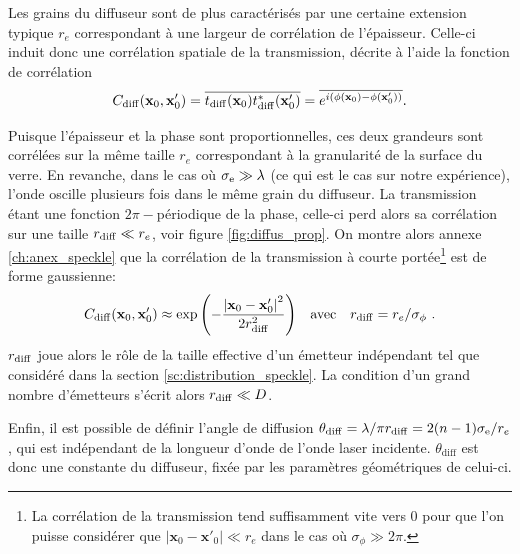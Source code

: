 Les grains du diffuseur sont de plus caractérisés par une certaine extension typique $r_e$ correspondant à une largeur de corrélation de l'épaisseur. Celle-ci induit donc une corrélation spatiale de la transmission, décrite à l'aide la fonction de corrélation
\begin{equation}
C_{\mathrm{diff}}(\mathbf{x}_0,\mathbf{x}'_0)=\overline{t_{\mathrm{diff}}(\mathbf{x}_0)t_{\mathrm{diff}}^*(\mathbf{x}'_0)}=\overline{e^{i(\phi(\mathbf{x}_0)-\phi(\mathbf{x}'_0))}} { .}
\end{equation}

Puisque l'épaisseur et la phase sont proportionnelles, ces deux grandeurs sont corrélées sur la même taille $r_e$ correspondant à la granularité de la surface du verre. En revanche, dans le cas où $\sigma_{\mathrm{e}} \gg \lambda$ (ce qui est le cas sur notre expérience), l'onde oscille plusieurs fois dans le même grain du diffuseur. La transmission étant une fonction $2\pi-$périodique de la phase, celle-ci perd alors sa corrélation sur une taille $r_{\mathrm{diff}} \ll r_e$, voir figure \ref{fig:diffus_prop}. On montre alors annexe \ref{ch:anex_speckle} que la corrélation de la transmission à courte portée\footnote{La corrélation de la transmission tend suffisamment vite vers 0 pour que l'on puisse considérer que $\left|\mathbf{x}_0-\mathbf{x}'_0 \right| \ll r_e$ dans le cas où $\sigma_\phi \gg 2\pi$.} est de forme gaussienne:
\begin{equation}
C_{\mathrm{diff}}(\mathbf{x}_0,\mathbf{x}'_0)\approx \exp{\left( -\frac{\left| \mathbf{x}_0 - \mathbf{x}'_0 \right| ^2}{2 r_{\mathrm{diff}}^2}\right) } \quad \text{avec} \quad r_{\mathrm{diff}}=r_e/\sigma_\phi \text{ .}
\end{equation}
$r_{\mathrm{diff}}$ joue alors le rôle de la taille effective d'un émetteur indépendant tel que considéré dans la section \ref{sc:distribution_speckle}. La condition d'un grand nombre d'émetteurs s'écrit alors $r_{\mathrm{diff}} \ll D$.

Enfin, il est possible de définir l'angle de diffusion $\theta_{\mathrm{diff}}=\lambda/\pi r_{\mathrm{diff}}=2(n-1) \sigma_{\mathrm{e}}/r_e$, qui est indépendant de la longueur d'onde de l'onde laser incidente. $\theta_{\mathrm{diff}}$ est donc une constante du diffuseur, fixée par les paramètres géométriques de celui-ci.










